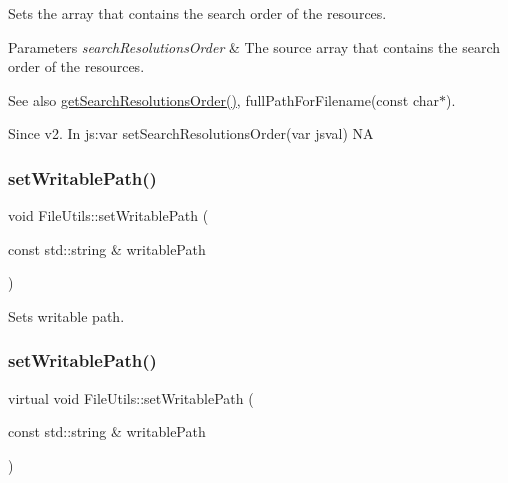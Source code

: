 Sets the array that contains the search order of the resources.


\begin{DoxyParams}{Parameters}
{\em search\+Resolutions\+Order} & The source array that contains the search order of the resources. \\
\hline
\end{DoxyParams}
\begin{DoxySeeAlso}{See also}
\hyperlink{classFileUtils_a079329ce5d4a0154fed6a3987d42dc26}{get\+Search\+Resolutions\+Order()}, full\+Path\+For\+Filename(const char$\ast$). 
\end{DoxySeeAlso}
\begin{DoxySince}{Since}
v2. In js\+:var set\+Search\+Resolutions\+Order(var jsval)  NA 
\end{DoxySince}
\mbox{\label{classFileUtils_ac8241b72075065d1d23581761e051b75}} 
\subsubsection{\texorpdfstring{set\+Writable\+Path()}{setWritablePath()}\hspace{0.1cm}{\footnotesize\ttfamily [1/2]}}
{\footnotesize\ttfamily void File\+Utils\+::set\+Writable\+Path (\begin{DoxyParamCaption}\item[{const std\+::string \&}]{writable\+Path }\end{DoxyParamCaption})\hspace{0.3cm}{\ttfamily [virtual]}}

Sets writable path. \mbox{\label{classFileUtils_a198fe2619bd2bf551efeccf6010268b0}} 
\subsubsection{\texorpdfstring{set\+Writable\+Path()}{setWritablePath()}\hspace{0.1cm}{\footnotesize\ttfamily [2/2]}}
{\footnotesize\ttfamily virtual void File\+Utils\+::set\+Writable\+Path (\begin{DoxyParamCaption}\item[{const std\+::string \&}]{writable\+Path }\end{DoxyParamCaption})\hspace{0.3cm}{\ttfamily [virtual]}}

